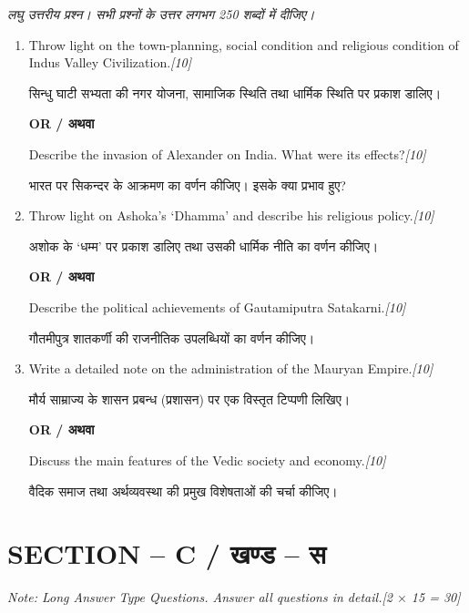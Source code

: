 \documentclass[11pt,a4paper]{article}
\newcommand{\pts}[1]{\hfill \textit{[#1]}}
\begin{document}
\noindent \textit{लघु उत्तरीय प्रश्न। सभी प्रश्नों के उत्तर लगभग 250 शब्दों में दीजिए।}

\begin{enumerate}[label=\textbf{\arabic*.},leftmargin=*,start=2,itemsep=12pt]

  \item Throw light on the town-planning, social condition and religious condition of Indus Valley Civilization.\pts{10}
  
  सिन्धु घाटी सभ्यता की नगर योजना, सामाजिक स्थिति तथा धार्मिक स्थिति पर प्रकाश डालिए।

  \begin{center}\textbf{OR / अथवा}\end{center}

  Describe the invasion of Alexander on India. What were its effects?\pts{10}
  
  भारत पर सिकन्दर के आक्रमण का वर्णन कीजिए। इसके क्या प्रभाव हुए?

  \item Throw light on Ashoka's `Dhamma' and describe his religious policy.\pts{10}
  
  अशोक के `धम्म' पर प्रकाश डालिए तथा उसकी धार्मिक नीति का वर्णन कीजिए।

  \begin{center}\textbf{OR / अथवा}\end{center}

  Describe the political achievements of Gautamiputra Satakarni.\pts{10}
  
  गौतमीपुत्र शातकर्णी की राजनीतिक उपलब्धियों का वर्णन कीजिए।

  \item Write a detailed note on the administration of the Mauryan Empire.\pts{10}
  
  मौर्य साम्राज्य के शासन प्रबन्ध (प्रशासन) पर एक विस्तृत टिप्पणी लिखिए।

  \begin{center}\textbf{OR / अथवा}\end{center}

  Discuss the main features of the Vedic society and economy.\pts{10}
  
  वैदिक समाज तथा अर्थव्यवस्था की प्रमुख विशेषताओं की चर्चा कीजिए।

\end{enumerate}

\bigskip

\section*{SECTION -- C / खण्ड -- स}
\noindent \textit{Note: Long Answer Type Questions. Answer all questions in detail.}\pts{2 $\times$ 15 = 30}
\end{document}
